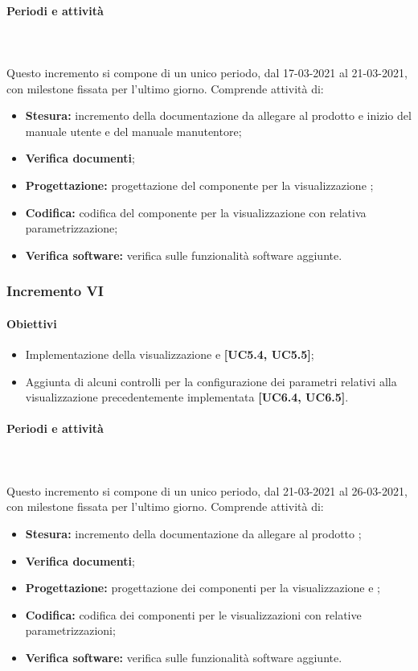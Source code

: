 \paragraph{Periodi e attività} \mbox{}\\\mbox{}\\
Questo incremento si compone di un unico periodo, dal 17-03-2021 al 21-03-2021, con milestone fissata per l'ultimo giorno. Comprende attività di:
\begin{itemize}
\item \textbf{Stesura:} incremento della documentazione da allegare al prodotto e inizio del manuale utente e del manuale manutentore;
\item \textbf{Verifica documenti};
\item \textbf{Progettazione:} progettazione del componente per la visualizzazione ;
\item \textbf{Codifica:} codifica del componente per la visualizzazione con relativa parametrizzazione;
\item \textbf{Verifica software:} verifica sulle funzionalità software aggiunte.
\end{itemize}

\subsubsection{Incremento VI}

\paragraph{Obiettivi}
\begin{itemize}
\item Implementazione della visualizzazione  e  \textbf{[UC5.4, UC5.5]};
\item Aggiunta di alcuni controlli per la configurazione dei parametri relativi alla visualizzazione precedentemente implementata \textbf{[UC6.4, UC6.5]}.
\end{itemize}

\paragraph{Periodi e attività} \mbox{}\\\mbox{}\\
Questo incremento si compone di un unico periodo, dal 21-03-2021 al 26-03-2021, con milestone fissata per l'ultimo giorno. Comprende attività di:
\begin{itemize}
\item \textbf{Stesura:} incremento della documentazione da allegare al prodotto ;
\item \textbf{Verifica documenti};
\item \textbf{Progettazione:} progettazione dei componenti per la visualizzazione  e ;
\item \textbf{Codifica:} codifica dei componenti per le visualizzazioni con relative parametrizzazioni;
\item \textbf{Verifica software:} verifica sulle funzionalità software aggiunte.
\end{itemize}

